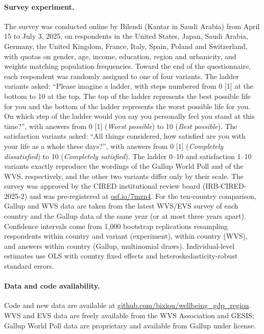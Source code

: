 \documentclass[10pt]{article}
\begin{document}
\paragraph{Survey experiment.} The survey was conducted online by Bilendi (Kantar in Saudi Arabia) from April 15 to July 3, 2025, on \nFabre respondents in the United States, Japan, Saudi Arabia, Germany, the United Kingdom, France, Italy, Spain, Poland and Switzerland, with quotas on gender, age, income, education, region and urbanicity, and weights matching population frequencies. Toward the end of the questionnaire, each respondent was randomly assigned to one of four variants. The ladder variants asked: ``Please imagine a ladder, with steps numbered from 0 [1] at the bottom to 10 at the top. The top of the ladder represents the best possible life for you and the bottom of the ladder represents the worst possible life for you. On which step of the ladder would you say you personally feel you stand at this time?'', with answers from 0 [1] (\textit{Worst possible}) to 10 (\textit{Best possible}). The satisfaction variants asked: ``All things considered, how satisfied are you with your life as a whole these days?'', with answers from 0 [1] (\textit{Completely dissatisfied}) to 10 (\textit{Completely satisfied}). The ladder 0--10 and satisfaction 1--10 variants exactly reproduce the wordings of the Gallup World Poll and of the WVS, respectively, and the other two variants differ only by their scale. The survey was approved by the CIRED institutional review board (IRB-CIRED-2025-2) %
and %
was pre-registered at \href{https://osf.io/7mzn4}{osf.io/7mzn4}. For the ten-country comparison, Gallup and WVS data are taken from the latest WVS/EVS survey of each country and the Gallup data of the same year (or at most three years apart). Confidence intervals come from 1,000 bootstrap replications resampling respondents within country and variant (experiment), within country (WVS), and answers within country (Gallup, multinomial draws). Individual-level estimates use OLS with country fixed effects and heteroskedasticity-robust standard errors.

\paragraph{Data and code availability.} Code and new data are available at \href{https://github.com/bixiou/wellbeing_gdp_region}{github.com/bixiou/wellbeing\_gdp\_region}. WVS and EVS data are freely available from the WVS Association and GESIS; Gallup World Poll data are proprietary and available from Gallup under license.
\end{document}
